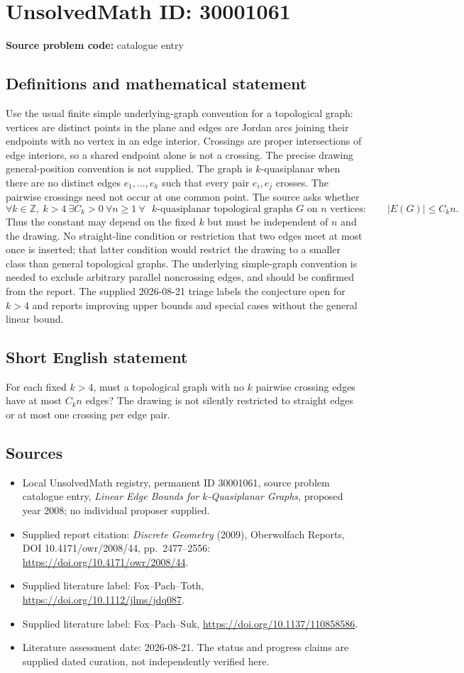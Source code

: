 \documentclass[11pt]{article}
\newcommand{\Z}{\mathbb{Z}}
\begin{document}
\section*{UnsolvedMath ID: 30001061}
\textbf{Source problem code:} catalogue entry
\subsection{Definitions and mathematical statement}
Use the usual finite simple underlying-graph convention for a topological graph: vertices are distinct points in the plane and edges are Jordan arcs joining their endpoints with no vertex in an edge interior. Crossings are proper intersections of edge interiors, so a shared endpoint alone is not a crossing. The precise drawing general-position convention is not supplied. The graph is $k$-quasiplanar when there are no distinct edges $e_1,\ldots,e_k$ such that every pair $e_i,e_j$ crosses. The pairwise crossings need not occur at one common point. The source asks whether \[\forall k\in\Z,\ k>4\ \exists C_k>0\ \forall n\geq1\ \forall\text{ $k$-quasiplanar topological graphs }G\text{ on }n\text{ vertices}:\qquad |E(G)|\leq C_k n.\] Thus the constant may depend on the fixed $k$ but must be independent of $n$ and the drawing. No straight-line condition or restriction that two edges meet at most once is inserted; that latter condition would restrict the drawing to a smaller class than general topological graphs. The underlying simple-graph convention is needed to exclude arbitrary parallel noncrossing edges, and should be confirmed from the report. The supplied 2026-08-21 triage labels the conjecture open for $k>4$ and reports improving upper bounds and special cases without the general linear bound.
\subsection{Short English statement}
For each fixed $k>4$, must a topological graph with no $k$ pairwise crossing edges have at most $C_k n$ edges? The drawing is not silently restricted to straight edges or at most one crossing per edge pair.
\subsection{Sources}
\begin{itemize}\item Local UnsolvedMath registry, permanent ID 30001061, source problem catalogue entry, \emph{Linear Edge Bounds for $k$-Quasiplanar Graphs}, proposed year 2008; no individual proposer supplied.\item Supplied report citation: \emph{Discrete Geometry} (2009), Oberwolfach Reports, DOI 10.4171/owr/2008/44, pp.\ 2477--2556: \url{https://doi.org/10.4171/owr/2008/44}.\item Supplied literature label: Fox--Pach--Toth, \url{https://doi.org/10.1112/jlms/jdq087}.\item Supplied literature label: Fox--Pach--Suk, \url{https://doi.org/10.1137/110858586}.\item Literature assessment date: 2026-08-21. The status and progress claims are supplied dated curation, not independently verified here.\end{itemize}
\end{document}
